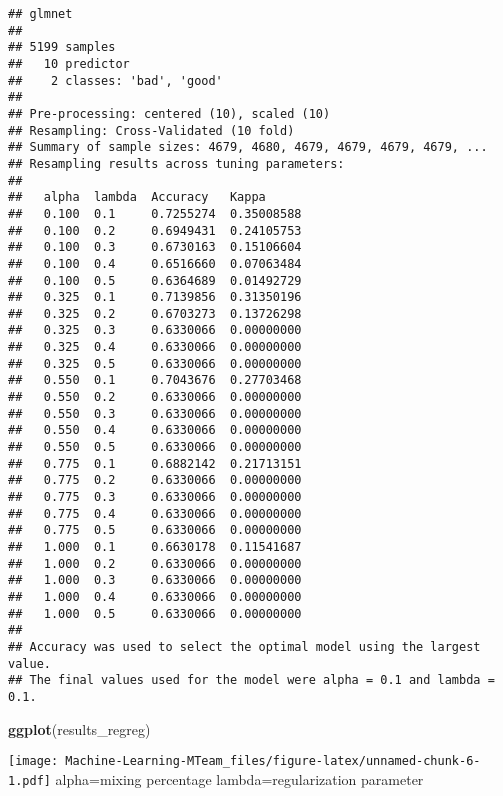 \documentclass[]{book}
\newenvironment{Shaded}{\begin{snugshade}}{\end{snugshade}}
\newcommand{\KeywordTok}[1]{\textcolor[rgb]{0.13,0.29,0.53}{\textbf{#1}}}
\newcommand{\DataTypeTok}[1]{\textcolor[rgb]{0.13,0.29,0.53}{#1}}
\newcommand{\StringTok}[1]{\textcolor[rgb]{0.31,0.60,0.02}{#1}}
\newcommand{\OperatorTok}[1]{\textcolor[rgb]{0.81,0.36,0.00}{\textbf{#1}}}
\newcommand{\NormalTok}[1]{#1}
\begin{document}
\begin{verbatim}
## glmnet 
## 
## 5199 samples
##   10 predictor
##    2 classes: 'bad', 'good' 
## 
## Pre-processing: centered (10), scaled (10) 
## Resampling: Cross-Validated (10 fold) 
## Summary of sample sizes: 4679, 4680, 4679, 4679, 4679, 4679, ... 
## Resampling results across tuning parameters:
## 
##   alpha  lambda  Accuracy   Kappa     
##   0.100  0.1     0.7255274  0.35008588
##   0.100  0.2     0.6949431  0.24105753
##   0.100  0.3     0.6730163  0.15106604
##   0.100  0.4     0.6516660  0.07063484
##   0.100  0.5     0.6364689  0.01492729
##   0.325  0.1     0.7139856  0.31350196
##   0.325  0.2     0.6703273  0.13726298
##   0.325  0.3     0.6330066  0.00000000
##   0.325  0.4     0.6330066  0.00000000
##   0.325  0.5     0.6330066  0.00000000
##   0.550  0.1     0.7043676  0.27703468
##   0.550  0.2     0.6330066  0.00000000
##   0.550  0.3     0.6330066  0.00000000
##   0.550  0.4     0.6330066  0.00000000
##   0.550  0.5     0.6330066  0.00000000
##   0.775  0.1     0.6882142  0.21713151
##   0.775  0.2     0.6330066  0.00000000
##   0.775  0.3     0.6330066  0.00000000
##   0.775  0.4     0.6330066  0.00000000
##   0.775  0.5     0.6330066  0.00000000
##   1.000  0.1     0.6630178  0.11541687
##   1.000  0.2     0.6330066  0.00000000
##   1.000  0.3     0.6330066  0.00000000
##   1.000  0.4     0.6330066  0.00000000
##   1.000  0.5     0.6330066  0.00000000
## 
## Accuracy was used to select the optimal model using the largest value.
## The final values used for the model were alpha = 0.1 and lambda = 0.1.
\end{verbatim}

\begin{Shaded}
\begin{Highlighting}[]
\KeywordTok{ggplot}\NormalTok{(results_regreg)}
\end{Highlighting}
\end{Shaded}

\texttt{[image: Machine-Learning-MTeam\_files/figure-latex/unnamed-chunk-6-1.pdf]}
alpha=mixing percentage
lambda=regularization parameter

\begin{Shaded}
\end{Shaded}
\end{document}
